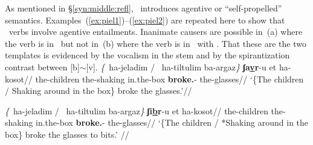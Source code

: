 As mentioned in \S\ref{syn:middle:refl}, \va~introduces agentive or ``self-propelled'' \citep{folliharley08} semantics. Examples~(\ref{ex:piel1})--(\ref{ex:piel2}) are repeated here to show that \tpie~verbs involve agentive entailments. Inanimate causers are possible in~(\nextx a) where the verb is in \tkal~but not in~(\nextx b) where the verb is in \tpie~with \va. That these are the two templates is evidenced by the vocalism in the stem and by the spirantization contrast between [b]$\sim$[v].
\pex
	\a \begingl
		\gla \emph{\{}\cmark~ha-jeladim / \cmark~ha-tiltulim ba-argaz\emph{\}} \textbf{ʃa\underline{v}r}-u et ha-kosot//
		\glb \phantom{\{\cmark~}the-children {} \phantom{\cmark~}the-shaking in.the-box \textbf{broke.}-  the-glasses//
		\glft `\{The children / Shaking around in the box\} broke the glasses.'//
		\endgl
	
	\a \begingl
		\gla \emph{\{}\cmark~ha-jeladim / \xmark~ha-tiltulim ba-argaz\emph{\}} \textbf{ʃi\underline{b}r}-u et ha-kosot//
		\glb \phantom{\{\cmark~}the-children {} \phantom{\xmark~}the-shaking in.the-box \textbf{broke.}-  the-glasses//
		\glft `\{The children / *Shaking around in the box\} broke the glasses to bits.' //
		\endgl
\xe


